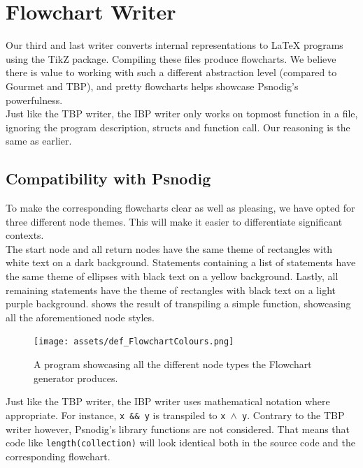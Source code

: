 \section{Flowchart Writer}

Our third and last writer converts internal representations to LaTeX programs using the TikZ package. Compiling these files produce flowcharts. We believe there is value to working with such a different abstraction level (compared to Gourmet and TBP), and pretty flowcharts helps showcase Psnodig's powerfulness. \\

Just like the TBP writer, the IBP writer only works on topmost function in a file, ignoring the program description, structs and function call. Our reasoning is the same as earlier. \\

\subsection{Compatibility with Psnodig}

To make the corresponding flowcharts clear as well as pleasing, we have opted for three different node themes. This will make it easier to differentiate significant contexts. \\

The start node and all return nodes have the same theme of rectangles with white text on a dark background. Statements containing a list of statements have the same theme of ellipses with black text on a yellow background. Lastly, all remaining statements have the theme of rectangles with black text on a light purple background.  shows the result of transpiling a simple function, showcasing all the aforementioned node styles. \\

\begin{figure}[ht]
    \centering
    \texttt{[image: assets/def\_FlowchartColours.png]}
    \caption{A program showcasing all the different node types the Flowchart generator produces.}
    \label{flowchartColours}
\end{figure}

Just like the TBP writer, the IBP writer uses mathematical notation where appropriate. For instance, \texttt{x \&\& y} is transpiled to \texttt{x $\land$ y}. Contrary to the TBP writer however, Psnodig's library functions are not considered. That means that code like \texttt{length(collection)} will look identical both in the source code and the corresponding flowchart. \\

